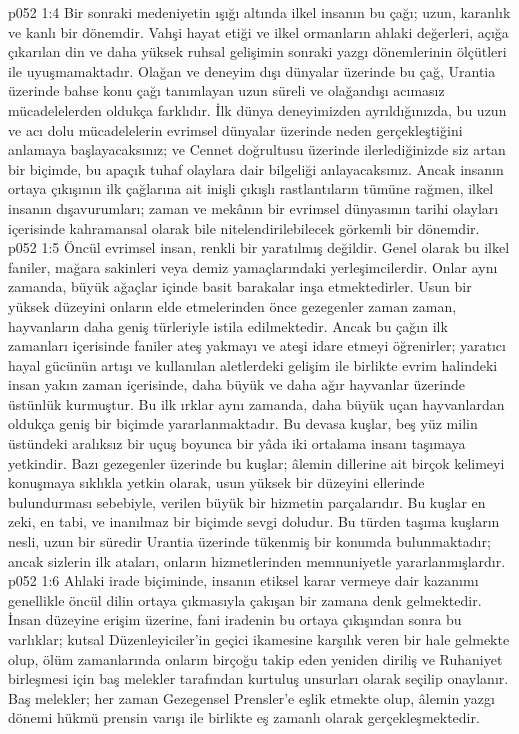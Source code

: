 \vs p052 1:4 Bir sonraki medeniyetin ışığı altında ilkel insanın bu çağı; uzun, karanlık ve kanlı bir dönemdir. Vahşi hayat etiği ve ilkel ormanların ahlaki değerleri, açığa çıkarılan din ve daha yüksek ruhsal gelişimin sonraki yazgı dönemlerinin ölçütleri ile uyuşmamaktadır. Olağan ve deneyim dışı dünyalar üzerinde bu çağ, Urantia üzerinde bahse konu çağı tanımlayan uzun süreli ve olağandışı acımasız mücadelelerden oldukça farklıdır. İlk dünya deneyimizden ayrıldığınızda, bu uzun ve acı dolu mücadelelerin evrimsel dünyalar üzerinde neden gerçekleştiğini anlamaya başlayacaksınız; ve Cennet doğrultusu üzerinde ilerlediğinizde siz artan bir biçimde, bu apaçık tuhaf olaylara dair bilgeliği anlayacaksınız. Ancak insanın ortaya çıkışının ilk çağlarına ait inişli çıkışlı rastlantıların tümüne rağmen, ilkel insanın dışavurumları; zaman ve mekânın bir evrimsel dünyasının tarihi olayları içerisinde kahramansal olarak bile nitelendirilebilecek görkemli bir dönemdir.
\vs p052 1:5 Öncül evrimsel insan, renkli bir yaratılmış değildir. Genel olarak bu ilkel faniler, mağara sakinleri veya demiz yamaçlarındaki yerleşimcilerdir. Onlar aynı zamanda, büyük ağaçlar içinde basit barakalar inşa etmektedirler. Usun bir yüksek düzeyini onların elde etmelerinden önce gezegenler zaman zaman, hayvanların daha geniş türleriyle istila edilmektedir. Ancak bu çağın ilk zamanları içerisinde faniler ateş yakmayı ve ateşi idare etmeyi öğrenirler; yaratıcı hayal gücünün artışı ve kullanılan aletlerdeki gelişim ile birlikte evrim halindeki insan yakın zaman içerisinde, daha büyük ve daha ağır hayvanlar üzerinde üstünlük kurmuştur. Bu ilk ırklar aynı zamanda, daha büyük uçan hayvanlardan oldukça geniş bir biçimde yararlanmaktadır. Bu devasa kuşlar, beş yüz milin üstündeki aralıksız bir uçuş boyunca bir yâda iki ortalama insanı taşımaya yetkindir. Bazı gezegenler üzerinde bu kuşlar; âlemin dillerine ait birçok kelimeyi konuşmaya sıklıkla yetkin olarak, usun yüksek bir düzeyini ellerinde bulundurması sebebiyle, verilen büyük bir hizmetin parçalarıdır. Bu kuşlar en zeki, en tabi, ve inanılmaz bir biçimde sevgi doludur. Bu türden taşıma kuşların nesli, uzun bir süredir Urantia üzerinde tükenmiş bir konumda bulunmaktadır; ancak sizlerin ilk ataları, onların hizmetlerinden memnuniyetle yararlanmışlardır.
\vs p052 1:6 Ahlaki irade biçiminde, insanın etiksel karar vermeye dair kazanımı genellikle öncül dilin ortaya çıkmasıyla çakışan bir zamana denk gelmektedir. İnsan düzeyine erişim üzerine, fani iradenin bu ortaya çıkışından sonra bu varlıklar; kutsal Düzenleyiciler’in geçici ikamesine karşılık veren bir hale gelmekte olup, ölüm zamanlarında onların birçoğu takip eden yeniden diriliş ve Ruhaniyet birleşmesi için baş melekler tarafından kurtuluş unsurları olarak seçilip onaylanır. Baş melekler; her zaman Gezegensel Prensler’e eşlik etmekte olup, âlemin yazgı dönemi hükmü prensin varışı ile birlikte eş zamanlı olarak gerçekleşmektedir.
